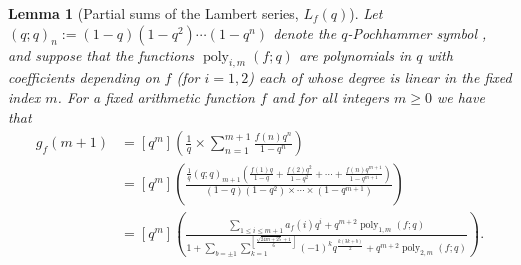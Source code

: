 \documentclass[12pt,reqno,a4letter]{article}
\numberwithin{figure}{section}
\numberwithin{table}{section}
\numberwithin{equation}{section}
\let\citep\cite
\DeclareMathOperator{\poly}{poly}
\theoremstyle{plain}
\newtheorem{lemma}[theorem]{Lemma}
\numberwithin{theorem}{section}
\theoremstyle{definition}
\begin{document}
\begin{lemma}[Partial sums of the Lambert series, $L_f(q)$] 
\label{lemma_LS_partial_sum_exps} 
Let $(q; q)_n := (1-q)(1-q^2) \cdots (1-q^{n})$ denote the 
\emph{$q$-Pochhammer symbol} \citep[\S 17.2]{NISTHB}, and suppose that the functions 
$\poly_{i,m}(f; q)$ are polynomials in $q$ with coefficients depending on $f$ 
(for $i = 1,2$) each of whose degree is linear in the fixed index $m$. 
For a fixed arithmetic function $f$ and for all integers $m \geq 0$ we 
have that 
\begin{subequations} 
\begin{align} 
\label{eqn_bmp1_coeff_exp_va} 
g_f(m+1) & = [q^m]\left(\frac{1}{q} \times \sum_{n=1}^{m+1} 
     \frac{f(n) q^n}{1-q^n}\right) \\ 
\label{eqn_bmp1_coeff_exp_vb} 
     & = 
     [q^m]\left(\frac{\frac{1}{q} (q; q)_{m+1} 
     \left(\frac{f(1) q}{1-q} + 
     \frac{f(2) q^2}{1-q^2} + \cdots + \frac{f(n) q^{m+1}}{1-q^{m+1}}\right)}{ 
     (1-q)(1-q^2) \times \cdots \times (1-q^{m+1})}\right) \\ 
\label{eqn_bmp1_coeff_exp_vc} 
     & = 
     [q^m]\left(\frac{\sum_{1 \leq i \leq m+1} a_f(i) q^i + 
     q^{m+2} \poly_{1,m}(f; q)}{ 
     1 + \sum\limits_{b=\pm 1} \sum\limits_{k=1}^{\left\lfloor \frac{\sqrt{24m+25}+1}{6} \right\rfloor} 
     (-1)^k q^{\frac{k(3k+b)}{2}} + 
     q^{m+2} \poly_{2,m}(f; q)}\right). 
\end{align} 
\end{subequations} 
\end{lemma} 
\end{document}
